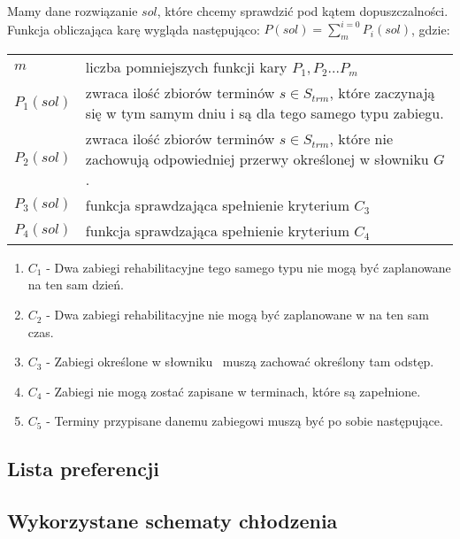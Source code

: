 Mamy dane rozwiązanie $sol$, które chcemy sprawdzić pod kątem dopuszczalności.
Funkcja obliczająca karę wygląda następująco: $P(sol) = \sum_m^{i=0} P_i(sol)$, gdzie:
\begin{center}
	\begin{tabular}{ m{} | m{} }
		$m$ &  liczba pomniejszych funkcji kary $P_1,P_2...P_m$\\
		$P_1(sol)$ & zwraca ilość zbiorów terminów $s \in S_{trm}$, które zaczynają się w tym
		samym dniu i są dla tego samego typu zabiegu. \\
		$P_2(sol)$ & zwraca ilość zbiorów terminów $s \in S_{trm}$,
		które nie zachowują odpowiedniej przerwy określonej w słowniku
		$G$. \\
		$P_3(sol)$ & funkcja sprawdzająca spełnienie kryterium $C_3$ \\
		$P_4(sol)$ & funkcja sprawdzająca spełnienie kryterium $C_4$ \\
\end{tabular}
\end{center}
\begin{enumerate}
	\item{$C_1$ - Dwa zabiegi rehabilitacyjne tego samego typu nie mogą być
		zaplanowane na ten sam dzień.}
	\item{$C_2$ - Dwa zabiegi rehabilitacyjne nie mogą być zaplanowane w na ten sam czas.}
	\item{$C_3$ - Zabiegi określone w słowniku \sGap\ muszą zachować określony tam odstęp.}
	\item{$C_4$ - Zabiegi nie mogą zostać zapisane w terminach, które są zapełnione.}
	\item{$C_5$ - Terminy przypisane danemu zabiegowi muszą być po sobie następujące.}
\end{enumerate}
\subsection{Lista preferencji}
\subsection{Wykorzystane schematy chłodzenia}
